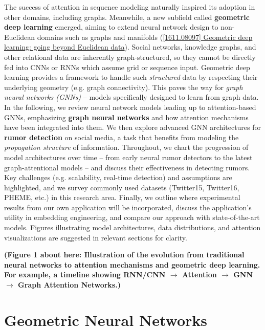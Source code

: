 \documentclass[12pt,a4paper]{report}
\begin{document}
The success of attention in sequence modeling naturally inspired its adoption in other domains, including graphs. Meanwhile, a new subfield called \textbf{geometric deep learning} emerged, aiming to extend neural network design to non-Euclidean domains such as graphs and manifolds (\href{https://arxiv.org/abs/1611.08097#:~:text=Euclidean%20or%20grid,directions%20in%20this%20nascent%20field}{[1611.08097] Geometric deep learning: going beyond Euclidean data}). Social networks, knowledge graphs, and other relational data are inherently graph-structured, so they cannot be directly fed into CNNs or RNNs which assume grid or sequence input. Geometric deep learning provides a framework to handle such \textit{structured} data by respecting their underlying geometry (e.g. graph connectivity). This paves the way for \textit{graph neural networks (GNNs)} – models specifically designed to learn from graph data. In the following, we review neural network models leading up to attention-based GNNs, emphasizing \textbf{graph neural networks} and how attention mechanisms have been integrated into them. We then explore advanced GNN architectures for \textbf{rumor detection} on social media, a task that benefits from modeling the \textit{propagation structure} of information. Throughout, we chart the progression of model architectures over time – from early neural rumor detectors to the latest graph-attentional models – and discuss their effectiveness in detecting rumors. Key challenges (e.g. scalability, real-time detection) and assumptions are highlighted, and we survey commonly used datasets (Twitter15, Twitter16, PHEME, etc.) in this research area. Finally, we outline where experimental results from our own application will be incorporated, discuss the application’s utility in embedding engineering, and compare our approach with state-of-the-art models. Figures illustrating model architectures, data distributions, and attention visualizations are suggested in relevant sections for clarity.

\textbf{(Figure 1 about here: Illustration of the evolution from traditional neural networks to attention mechanisms and geometric deep learning. For example, a timeline showing RNN/CNN $\rightarrow$ Attention $\rightarrow$ GNN $\rightarrow$ Graph Attention Networks.)}

\chapter{Geometric Neural Networks}
\end{document}
